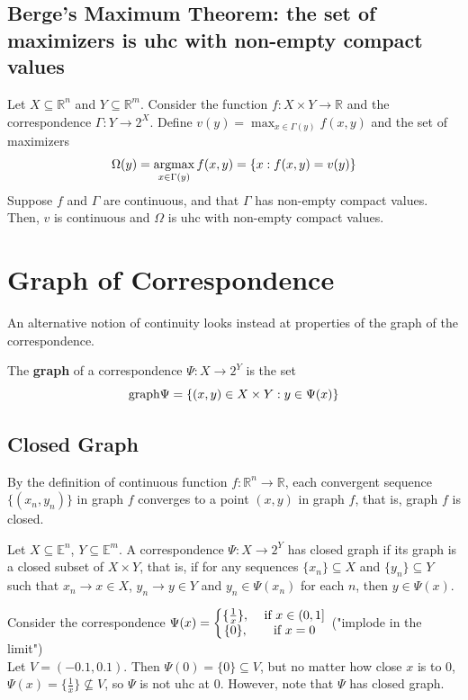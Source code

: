 \documentclass[11pt]{elegantbook}
\newcommand{\argmax}{\operatornamewithlimits{argmax}}
\begin{document}
\subsection{Berge's Maximum Theorem: the set of maximizers is uhc with non-empty compact values}
\begin{theorem}\label{thm:Berge's Maximum Theorem}
    Let $X \subseteq \mathbb{R}^n$ and $Y \subseteq \mathbb{R}^m$. Consider the function $f : X \times Y \rightarrow \mathbb{R}$ and the correspondence $\Gamma : Y \rightarrow 2^X$. Define $v(y) = \max_{x\in\Gamma(y)} f(x, y)$ and the set of maximizers $$\Omega(y) = \argmax_{x\in\Gamma(y)} f(x, y)=\{x:f(x,y)=v(y)\}$$
    Suppose $f$ and $\Gamma$ are continuous, and that $\Gamma$ has non-empty compact values. Then, $v$ is continuous and $\Omega$ is uhc with non-empty compact values.
\end{theorem}




\section{Graph of Correspondence}
An alternative notion of continuity looks instead at properties of the graph of the correspondence.
\begin{definition}
    \normalfont
    The \textbf{graph} of a correspondence $\Psi : X \rightarrow 2^Y$ is the set
    $$\textnormal{graph}\Psi=\{(x,y)\in X\times Y:y\in\Psi(x)\}$$
\end{definition}

\subsection{Closed Graph}
By the definition of continuous function $f:\mathbb{R}^n \rightarrow \mathbb{R}$,  each convergent sequence $\{(x_n, y_n)\}$ in graph $f$ converges to a point $(x, y)$ in graph $f$, that is, graph $f$ is closed.

\begin{definition}
    \normalfont
    Let $X\subseteq \mathbb{E}^n$, $Y\subseteq \mathbb{E}^m$. A correspondence $\Psi: X \rightarrow 2^Y$ has closed graph if its graph is a closed subset of $X \times Y$, that is, if for any sequences $\{x_n\} \subseteq X$ and $\{y_n\} \subseteq Y$ such that $x_n \rightarrow x \in X$, $y_n \rightarrow y \in Y$ and $y_n \in \Psi(x_n)$ for each $n$, then $y \in \Psi(x)$.
\end{definition}
\begin{example}
    Consider the correspondence $\Psi(x)=\left\{\begin{matrix}
        \{\frac{1}{x}\},&\textnormal{ if }x\in(0,1]\\
        \{0\},&\textnormal{ if }x=0
    \end{matrix}\right.$ ("implode in the limit")\\
    Let $V = (-0.1, 0.1)$. Then $\Psi(0) = \{0\} \subseteq V$, but no matter how close $x$ is to $0$, $\Psi(x)=\{\frac{1}{x}\}\nsubseteq V$, so $\Psi$ is not uhc at $0$. However, note that $\Psi$ has closed graph.
\end{example}
\end{document}
